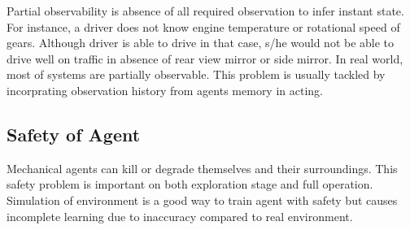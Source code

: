 Partial observability is absence of all required observation to infer instant state. 
For instance, a driver does not know engine temperature or rotational speed of gears. 
Although driver is able to drive in that case, s/he would not be able to drive well on traffic in absence of rear view mirror or side mirror. 
In real world, most of systems are partially observable. 
This problem is usually tackled by incorprating observation history from agents memory in acting. 

\subsection{Safety of Agent}

Mechanical agents can kill or degrade themselves and their surroundings. 
This safety problem is important on both exploration stage and full operation. 
Simulation of environment is a good way to train agent with safety but causes incomplete learning due to inaccuracy compared to real environment. 
